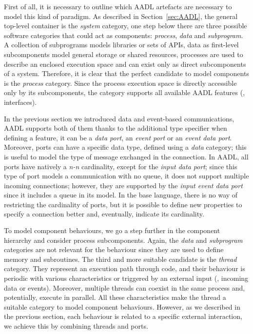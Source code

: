 First of all, it is necessary to outline which AADL artefacts are necessary to model this kind of paradigm. As described in Section~\ref{sec:AADL}, the general top-level container is the \textit{system} category, one step below there are three possible software categories that could act as components: \textit{process}, \textit{data} and \textit{subprogram}. A collection of subprograms models libraries or sets of APIs, data as first-level subcomponents model general storage or shared resources, processes are used to describe an enclosed execution space and can exist only as direct subcomponents of a system. Therefore, it is clear that the perfect candidate to model components is the \textit{process} category. Since the process execution space is directly accessible only by its subcomponents, the category supports all available AADL features (\ie, interfaces).

In the previous section we introduced data and event-based communications, AADL supports both of them thanks to the additional type specifier when defining a feature, it can be a \textit{data port}, an \textit{event port} or an \textit{event data port}. Moreover, ports can have a specific data type, defined using a \textit{data} category; this is useful to model the type of message exchanged in the connection. In AADL, all ports have natively a \textit{n-n} cardinality, except for the \textit{input data port}; since this type of port models a communication with no queue, it does not support multiple incoming connections; however, they are supported by the \textit{input event data port} since it includes a queue in its model. In the base language, there is no way of restricting the cardinality of ports, but it is possible to define new properties to specify a connection better and, eventually, indicate its cardinality.

To model component behaviours, we go a step further in the component hierarchy and consider process subcomponents. Again, the \textit{data} and \textit{subprogram} categories are not relevant for the behaviour since they are used to define memory and subroutines. The third and more suitable candidate is the \textit{thread} category. They represent an execution path through code, and their behaviour is periodic with various characteristics or triggered by an external input (\eg, incoming data or events). Moreover, multiple threads can coexist in the same process and, potentially, execute in parallel. All these characteristics make the thread a suitable category to model component behaviours. However, as we described in the previous section, each behaviour is related to a specific external interaction, we achieve this by combining threads and ports.

